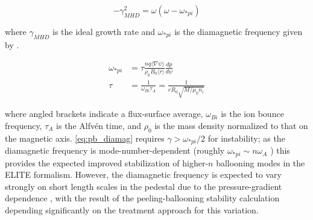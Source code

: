 \begin{equation}\label{eq:pb_diamag}
 -\gamma_{MHD}^2 = \omega(\omega - \omega_{*pi})
\end{equation}

\noindent where $\gamma_{MHD}$ is the ideal growth rate and $\omega_{*pi}$ is the diamagnetic frequency given by \cite{Snyder2009,Huysmans2001,Huysmans2005}.

\begin{equation}\label{eq:omegastar}
 \begin{aligned}
  \omega_{*pi} &= \tau \frac{nq \langle \nabla \psi \rangle}{\rho_0 B_0 \langle r \rangle} \frac{dp}{d\psi}\\
  \tau &= \frac{1}{\omega_{Bi} \tau_A} = \frac{1}{eR_0 \sqrt{M/\mu_0 n_i}}
 \end{aligned}
\end{equation}

\noindent where angled brackets indicate a flux-surface average, $\omega_{Bi}$ is the ion bounce frequency, $\tau_A$ is the Alfv\'en time, and $\rho_0$ is the mass density normalized to that on the magnetic axis.  \cref{eq:pb_diamag} requires $\gamma > \omega_{*pi}/2$ for instability; as the diamagnetic frequency is mode-number-dependent (roughly $\omega_{*pi} \sim n\omega_A$ \cite{Snyder2004}) this provides the expected improved stabilization of higher-$n$ ballooning modes in the ELITE formalism.  However, the diamagnetic frequency is expected to vary strongly on short length scales in the pedestal due to the pressure-gradient dependence \cite{Huysmans2005}, with the result of the peeling-ballooning stability calculation depending significantly on the treatment approach for this variation.


